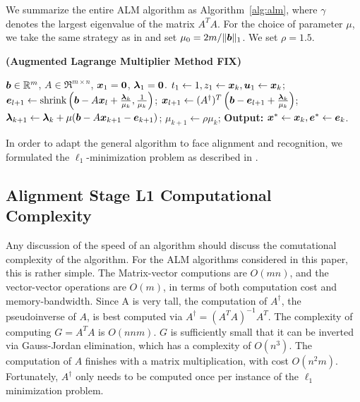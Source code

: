\documentclass[10pt,twocolumn,letterpaper]{article}
\begin{document}
We summarize the entire ALM
algorithm as Algorithm~\ref{alg:alm}, where $\gamma$ denotes the largest eigenvalue of the matrix $A^TA$. For the choice of parameter $\mu$, we take the same strategy as
in \cite{YangJ2009-pp} and set $\mu_0 = 2m / \|\boldsymbol{b}\|_1$. We set $\rho=1.5$.
\begin{algorithm}[h]
\caption{\bf (Augmented Lagrange Multiplier Method FIX)}
\begin{algorithmic}[1]
 $\boldsymbol{b} \in \mathbb R^m$, $A \in \Re^{m \times n}$,
${\boldsymbol{x}}_1 = \boldsymbol{0}$, $\boldsymbol{\lambda}_1 = \boldsymbol{0}$.
\STATE $t_{1} \leftarrow 1, z_{1} \leftarrow {\boldsymbol{x}}_{k}, \boldsymbol{u}_{1} \leftarrow {\boldsymbol{x}}_{k}$;
\STATE $\boldsymbol{e}_{l+1} \leftarrow \textup{shrink}\left(\boldsymbol{b} - A{\boldsymbol{x}}_l + \frac{\boldsymbol{\lambda}_k}{\mu_k}, \frac{1}{\mu_k}\right)$;
\STATE ${\boldsymbol{x}}_{l+1} \leftarrow (A^\dagger)^T \left(\boldsymbol{b} - \boldsymbol{e}_{l+1} + \frac{\boldsymbol{\lambda}_k}{\mu_k} \right) $;
\ENDWHILE
\STATE $\boldsymbol{\lambda}_{k+1} \leftarrow \boldsymbol{\lambda}_k + \mu (\boldsymbol{b} - A{\boldsymbol{x}}_{k+1} - \boldsymbol{e}_{k+1})$;
\STATE $\mu_{k+1} \leftarrow \rho\mu_k$;
\ENDWHILE \STATE
{\bf Output:} ${\boldsymbol{x}}^* \leftarrow {\boldsymbol{x}}_k, \boldsymbol{e}^* \leftarrow \boldsymbol{e}_k$.
\end{algorithmic}
\label{alg:alm}
\end{algorithm}



In order to adapt the general algorithm to face alignment and recognition, we formulated the 
$\ell_1$-minimization problem as described in \cite{}.

\subsection{Alignment Stage L1 Computational Complexity} Any discussion of the speed of an
algorithm should discuss the comutational complexity of the algorithm.  For the
ALM algorithms considered in this paper, this is rather simple.  The
Matrix-vector computions are $O(mn)$, and the vector-vector operations are
$O(m)$, in terms of both computation cost and memory-bandwidth.  Since A is
very tall, the computation of $A^\dagger$, the pseudoinverse of $A$, is best
computed via $A^\dagger = (A^TA)^{-1} A^T$.  The complexity of computing $G =
A^T A$ is $O(nnm)$.  $G$ is sufficiently small that it can be inverted via
Gauss-Jordan elimination, which has a complexity of $O(n^3)$.  The computation
of $A$ finishes with a matrix multiplication, with cost $O(n^2 m)$.
Fortunately, $A^\dagger$ only needs to be computed once per instance of the
$\ell_1$ minimization problem.
\end{document}
